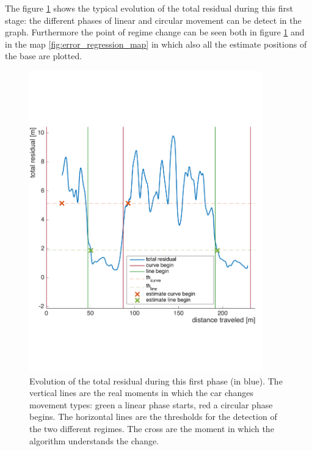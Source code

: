 The figure \ref{fig:error_regression} shows the typical evolution of the total residual during this first stage: the different phases of linear and circular movement can be detect in the graph. Furthermore the point of regime change can be seen both in figure \ref{fig:error_regression}  and in the map \ref{fig:error_regression_map} in which also all the estimate positions of the base are plotted.

\begin{figure}[!htbp]
    \centering
    \includegraphics[width=0.9\textwidth, height=0.5\textwidth]{img/following_platform_for_long_position_base_error.pdf}
    \caption{Evolution of the total residual during this first phase (in blue). The vertical lines are the real moments in which the car changes movement types: green a linear phase starts, red a circular phase begins. The horizontal lines are the thresholds for the detection of the two different regimes. The cross are the moment in which the algorithm understands the change.}
    \label{fig:error_regression}
\end{figure}
